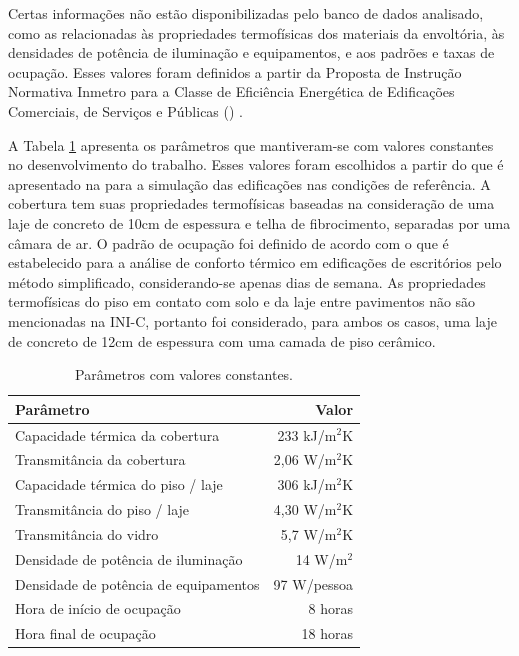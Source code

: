 \documentclass[brazil,hardcopy,openany,a5paper]{ufscthesis}
\begin{document}
		Certas informações não estão disponibilizadas pelo banco de dados analisado, como as relacionadas às propriedades termofísicas dos materiais da envoltória, às densidades de potência de iluminação e equipamentos, e aos padrões e taxas de ocupação. Esses valores foram definidos a partir da Proposta de Instrução Normativa Inmetro para a Classe de Eficiência Energética de Edificações Comerciais, de Serviços e Públicas () \cite{INIC}. %
		
		A Tabela \ref{table:paramconst} apresenta os parâmetros que mantiveram-se com valores constantes no desenvolvimento do trabalho. Esses valores foram escolhidos a partir do que é apresentado na  para a simulação das edificações nas condições de referência. A cobertura tem suas propriedades termofísicas baseadas na consideração de uma laje de concreto de 10cm de espessura e telha de fibrocimento, separadas por uma câmara de ar. O padrão de ocupação foi definido de acordo com o que é estabelecido para a análise de conforto térmico em edificações de escritórios pelo método simplificado, considerando-se apenas dias de semana. As propriedades termofísicas do piso em contato com solo e da laje entre pavimentos não são mencionadas na INI-C, portanto foi considerado, para ambos os casos, uma laje de concreto de 12cm de espessura com uma camada de piso cerâmico.
		
		\begin{table}[h]
			\centering
			\caption{Parâmetros com valores constantes.}
			\label{table:paramconst}
			\begin{tabular}{|l |r |}
				\hline
				\textbf{Parâmetro} & \textbf{Valor} \\
				\hline
				Capacidade térmica da cobertura & 233 kJ/m$^2$K \\
				\hline
				Transmitância da cobertura & 2,06 W/m$^2$K \\
				\hline
				Capacidade térmica do piso / laje & 306 kJ/m$^2$K \\
				\hline
				Transmitância do piso / laje & 4,30 W/m$^2$K \\
				\hline
				Transmitância do vidro & 5,7 W/m$^2$K \\
				\hline 
				Densidade de potência de iluminação & 14 W/m$^2$ \\
				\hline 
				Densidade de potência de equipamentos & 97 W/pessoa \\
				\hline 
				Hora de início de ocupação & 8 horas \\
				\hline 
				Hora final de ocupação & 18 horas \\
				\hline 
			\end{tabular}
		\end{table}
		
\end{document}
